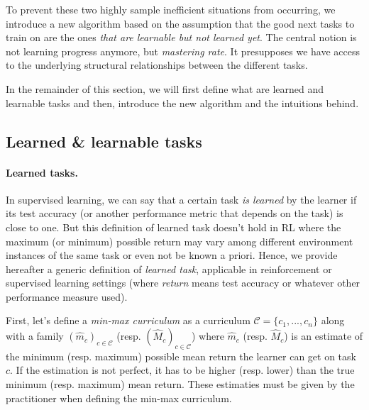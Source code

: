 \documentclass{article}
\begin{document}
To prevent these two highly sample inefficient situations from occurring, we introduce a new algorithm based on the assumption that the good next tasks to train on are the ones \textit{that are learnable but not learned yet}. The central notion is not learning progress anymore, but \textit{mastering rate}. It presupposes we have access to the underlying structural relationships between the different tasks.

In the remainder of this section, we will first define what are learned and learnable tasks and then, introduce the new algorithm and the intuitions behind.

\subsection{Learned \& learnable tasks}\label{sec:learned-learnable}
\paragraph{Learned tasks.}
In supervised learning, we can say that a certain task \textit{is learned} by the learner if its test accuracy (or another performance metric that depends on the task) is close to one. But this definition of learned task doesn't hold in RL where the maximum (or minimum) possible return may vary among different environment instances of the same task or even not be known a priori. Hence, we provide hereafter a generic definition of \textit{learned task}, applicable in reinforcement or supervised learning settings (where \textit{return} means test accuracy or whatever other performance measure used).


First, let's define a \textit{min-max curriculum} as a curriculum \(\mathcal{C}=\{c_1, ..., c_n\}\) along with a family \((\hat{m}_{c})_{c\in\mathcal{C}}\) (resp. \((\hat{M}_{c})_{c\in\mathcal{C}}\)) where  \(\hat{m}_c\) (resp. \(\hat{M}_c\)) is an estimate of the minimum (resp. maximum) possible mean return the learner can get on task \(c\).
If the estimation is not perfect, it has to be higher (resp. lower) than the true minimum (resp. maximum) mean return.
These estimaties must be given by the practitioner when defining the min-max curriculum.
\end{document}
